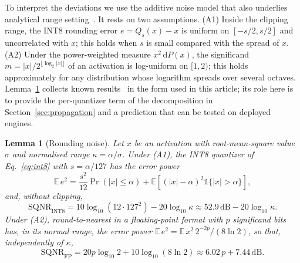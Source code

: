 \documentclass[pdflatex,sn-mathphys-num]{sn-jnl}%
\theoremstyle{thmstyleone}%
\newtheorem{lemma}[theorem]{Lemma}%
\theoremstyle{thmstyletwo}%
\theoremstyle{thmstylethree}%
\begin{document}
To interpret the deviations we use the additive noise model that also underlies analytical range setting~\cite{banner2019aciq,nagel2021whitepaper,gholami2021survey}. It rests on two assumptions. (A1) Inside the clipping range, the INT8 rounding error $e=Q_s(x)-x$ is uniform on $[-s/2,s/2]$ and uncorrelated with $x$; this holds when $s$ is small compared with the spread of $x$. (A2) Under the power-weighted measure $x^2\,\mathrm{d}P(x)$, the significand $m=|x|/2^{\lfloor\log_2|x|\rfloor}$ of an activation is log-uniform on $[1,2)$; this holds approximately for any distribution whose logarithm spreads over several octaves. Lemma~\ref{lem:noise} collects known results~\cite{banner2019aciq,kuzmin2022fp8,nagel2021whitepaper} in the form used in this article; its role here is to provide the per-quantizer term of the decomposition in Section~\ref{sec:propagation} and a prediction that can be tested on deployed engines.
\begin{lemma}[Rounding noise]\label{lem:noise}
Let $x$ be an activation with root-mean-square value $\sigma$ and normalised range $\kappa=\alpha/\sigma$. Under (A1), the INT8 quantizer of Eq.~\eqref{eq:int8} with $s=\alpha/127$ has the error power
\begin{equation}
\mathbb{E}\,e^2=\frac{s^2}{12}\Pr\left(|x|\le\alpha\right)+\mathbb{E}\!\left[\left(|x|-\alpha\right)^2\mathbb{1}\{|x|>\alpha\}\right],\label{eq:mse}
\end{equation}
and, without clipping,
\begin{equation}
\mathrm{SQNR}_\mathrm{INT8}=10\log_{10}\!\left(12\cdot127^2\right)-20\log_{10}\kappa\approx52.9\,\mathrm{dB}-20\log_{10}\kappa.\label{eq:sqnr-int8}
\end{equation}
Under (A2), round-to-nearest in a floating-point format with $p$ significand bits has, in its normal range, the error power $\mathbb{E}\,e^2=\mathbb{E}\,x^2\,2^{-2p}/(8\ln2)$, so that, independently of $\kappa$,
\begin{equation}
\mathrm{SQNR}_\mathrm{FP}=20p\log_{10}2+10\log_{10}\left(8\ln2\right)\approx6.02\,p+7.44\,\mathrm{dB}.\label{eq:sqnr-fp}
\end{equation}
\end{lemma}
\end{document}
